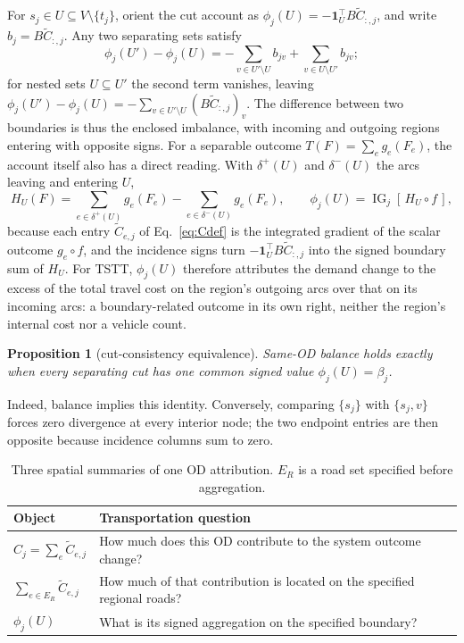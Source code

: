 \documentclass[a4paper,fleqn]{cas-sc}
\newtheorem*{uproposition}{Proposition}
\begin{document}
For $s_j\in U\subseteq V\setminus\{t_j\}$, orient the cut account as
$\phi_j(U)=-\mathbf1_U^\top B\widetilde C_{:,j}$, and write
$b_j=B\widetilde C_{:,j}$. Any two separating sets satisfy
\begin{equation}
\phi_j(U')-\phi_j(U)
=-\sum_{v\in U'\setminus U}b_{jv}
+\sum_{v\in U\setminus U'}b_{jv};
\label{eq:cutdiff}
\end{equation}
for nested sets $U\subseteq U'$ the second term vanishes, leaving
$\phi_j(U')-\phi_j(U)=-\sum_{v\in U'\setminus U}(B\widetilde C_{:,j})_v$.
The difference between two boundaries is thus the enclosed imbalance,
with incoming and outgoing regions entering with opposite signs.
For a separable outcome $T(F)=\sum_e g_e(F_e)$, the account itself
also has a direct reading. With $\delta^+(U)$ and $\delta^-(U)$ the
arcs leaving and entering $U$,
\begin{equation}
H_U(F)=\sum_{e\in\delta^+(U)}g_e(F_e)-\sum_{e\in\delta^-(U)}g_e(F_e),
\qquad
\phi_j(U)=\operatorname{IG}_j[\,H_U\circ f\,],
\label{eq:hboundary}
\end{equation}
because each entry $\widetilde C_{e,j}$ of Eq.~\eqref{eq:Cdef} is the
integrated gradient of the scalar outcome $g_e\circ f$, and the
incidence signs turn $-\mathbf 1_U^\top B\widetilde C_{:,j}$ into the
signed boundary sum of $H_U$. For TSTT, $\phi_j(U)$ therefore
attributes the demand change to the excess of the total travel cost on
the region's outgoing arcs over that on its incoming arcs: a
boundary-related outcome in its own right, neither the region's
internal cost nor a vehicle count.
\begin{uproposition}[cut-consistency equivalence]\label{par:cutequiv}
Same-OD balance holds exactly when every separating cut has one common
signed value $\phi_j(U)=\beta_j$.
\end{uproposition}
Indeed, balance implies this identity. Conversely, comparing $\{s_j\}$
with $\{s_j,v\}$ forces zero divergence at every interior node; the two
endpoint entries are then opposite because incidence columns sum to zero.

\begin{table}[pos=tb]
\caption{Three spatial summaries of one OD attribution. $E_R$ is a road set
specified before aggregation.}\label{tab:objects}
\begin{tabular*}{\tblwidth}{@{}p{5cm}p{9cm}@{}}
\toprule Object & Transportation question\\\midrule
$C_j=\sum_e\widetilde C_{e,j}$ & How much does this OD contribute to the system outcome change?\\
$\sum_{e\in E_R}\widetilde C_{e,j}$ & How much of that contribution is located on the specified regional roads?\\
$\phi_j(U)$ & What is its signed aggregation on the specified boundary?\\
\bottomrule\end{tabular*}\end{table}
\end{document}
